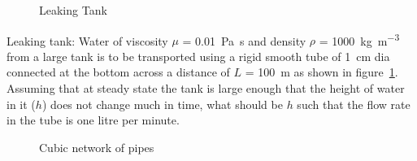 
\begin{figure}[h]
\begin{center}
\end{center}
\caption{Leaking Tank}
\label{LeakingTank}
\end{figure}

\begin{question}
Leaking tank: Water of viscosity $\mu$ = \SI{0.01}{\pascal\second} and density $\rho$ = \SI{1000}{\kilo\gram\per\metre\cubed} from a large tank is to be transported using a rigid smooth tube of \SI{1}{\centi\metre} dia connected at the bottom across a distance of $L$ = \SI{100}{\metre} as shown in figure~\ref{LeakingTank}. Assuming that at steady state the tank is large enough that the height of water in it ($h$) does not change much in time, what should be $h$ such that the flow rate in the tube is one litre per minute. 
\end{question}
\begin{solution}[print]
\end{solution}

\begin{figure}[h]
\begin{center}
\end{center}
\caption{Cubic network of pipes}
\label{CubicPipeNetwork}
\end{figure}

